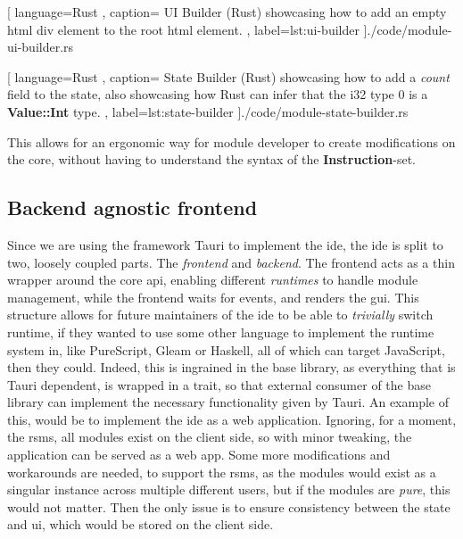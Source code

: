 \begin{center}
  
   [ language=Rust
   , caption={
     UI Builder (Rust) showcasing how to add an empty \gls*{html} div element to
     the root \gls*{html} element.
   }
   , label=lst:ui-builder
   ]{./code/module-ui-builder.rs}
\end{center}

\begin{center}
  
   [ language=Rust
   , caption={
     State Builder (Rust) showcasing how to add a \textit{count} field to the
     state, also showcasing how Rust can infer that the i32 type $0$ is
     a \textbf{Value::Int} type.
   }
   , label=lst:state-builder
   ]{./code/module-state-builder.rs}
\end{center}

This allows for an ergonomic way for module developer to create modifications on
the core, without having to understand the syntax of the
\textbf{Instruction}-set.

\subsection{Backend agnostic frontend}

Since we are using the framework Tauri to implement the \gls*{ide}, the \gls*{ide}
is split to two, loosely coupled parts. The \textit{frontend} and
\textit{backend}. The frontend acts as a thin wrapper around the core \gls*{api},
enabling different \textit{runtimes} to handle module management, while the
frontend waits for events, and renders the \gls*{gui}. This structure allows for
future maintainers of the \gls*{ide} to be able to \textit{trivially} switch
runtime, if they wanted to use some other language to implement the runtime
system in, like PureScript, Gleam or Haskell, all of which can target
JavaScript, then they could. Indeed, this is ingrained in the base library, as
everything that is Tauri dependent, is wrapped in a trait, so that external
consumer of the base library can implement the necessary functionality given by
Tauri. An example of this, would be to implement the \gls*{ide} as a web
application. Ignoring, for a moment, the \gls*{rsms}, all modules exist on the
client side, so with minor tweaking, the application can be served as a web
app. Some more modifications and workarounds are needed, to support the
\gls*{rsms}, as the modules would exist as a singular instance across multiple
different users, but if the modules are \textit{pure}, this would not matter.
Then the only issue is to ensure consistency between the state and \gls*{ui},
which would be stored on the client side.

